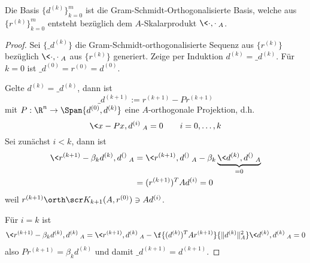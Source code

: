 \documentclass[11pt]{scrartcl}
\begin{document}
\begin{kor} \label{4.21}
	Die Basis $\{d^{(k)}\}_{k=0}^m$ ist die Gram-Schmidt-Orthogonalisierte Basis, welche aus $\{r^{(k)}\}_{k=0}^m$ entsteht bezüglich dem $A$-Skalarprodukt $\<\cdot,\cdot\>_A$.
	\begin{proof}
		Sei $\{\_d^{(k)}\}$ die Gram-Schmidt-orthogonalisierte Sequenz aus $\{r^{(k)}\}$ bezüglich $\<\cdot,\cdot\>_A$ aus $\{r^{(k)}\}$ generiert.
		Zeige per Induktion $d^{(k)} = \_d^{(k)}$.
		Für $k=0$ ist $\_d^{(0)} = r^{(0)} = d^{(0)}$.

		Gelte  $d^{(k)} = \_d^{(k)}$, dann ist
		\[
			\_d^{(k+1)} := r^{(k+1)} - Pr^{(k+1)}
		\]
		mit $P : \R^n \to \Span\{d^{(0)}, d^{(k)}\}$ eine $A$-orthogonale Projektion, d.h.
		\[
			\<x-Px, d^{(i)}\>_A = 0
			\qquad i = 0, \dotsc, k
		\]
		Sei zunächst $i<k$, dann ist
		\begin{align*}
			\< r^{(k+1)} - \beta_k d^{(k)}, d^{()} \>_A
			&= \< r^{(k+1)}, d^{()} \>_A - \beta_k \underbrace{\<d^{(k)}, d^{()} \>_A}_{=0} \\
			&= (r^{(k+1)})^T A d^{(i)}
			= 0
		\end{align*}
		weil $r^{(k+1)} \orth \scr K_{k+1} (A, r^{(0)}) \ni Ad^{(i)}$.

		Für $i = k$ ist
		\begin{align*}
			\<r^{(k+1)} - \beta_k d^{(k)}, d^{(k)}\>_A
			= \< r^{(k+1)}, d^{(k)}\>_A - \f{(d^{(k)})^T A r^{(k+1)}}{\|d^{(k)}\|_A^2} \<d^{(k)},d^{(k)}\>_A
			= 0
		\end{align*}
		also $P r^{(k+1)} = \beta_k d^{(k)}$ und damit $\_d^{(k+1)} = d^{(k+1)}$.
	\end{proof}
\end{kor}
\end{document}
